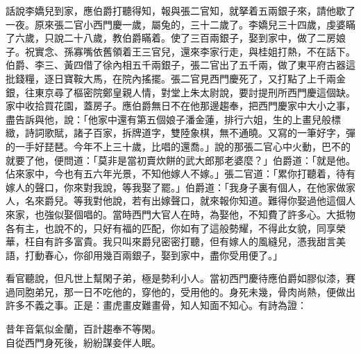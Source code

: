 話說李嬌兒到家，應伯爵打聽得知，報與張二官知，就拏着五兩銀子來，請他歇了一夜。原來張二官小西門慶一歲，屬兔的，三十二歲了。李嬌兒三十四歲，虔婆瞞了六歲，只說二十八歲，教伯爵瞞着。使了三百兩銀子，娶到家中，做了二房娘子。祝實念、孫寡嘴依舊領着王三官兒，還來李家行走，與桂姐打熱，不在話下。{}伯爵、李三、黃四借了徐內相五千兩銀子，張二官出了五千兩，做了東平府古器這批錢糧，逐日寶鞍大馬，在院內搖擺。張二官見西門慶死了，又打點了上千兩金銀，往東京尋了樞密院鄭皇親人情，對堂上朱太尉說，要討提刑所西門慶這個缺。家中收拾買花園，蓋房子。應伯爵無日不在他那邊趨奉，把西門慶家中大小之事，盡告訴與他，{}說：「他家中還有第五個娘子潘金蓮，排行六姐，生的上畫兒般標緻，詩詞歌賦，諸子百家，拆牌道字，雙陸象棋，無不通曉。又寫的一筆好字，彈的一手好琵琶。今年不上三十歲，比唱的還喬。」說的那張二官心中火動，巴不的就要了他，便問道：「莫非是當初賣炊餅的武大郎那老婆麼？」伯爵道：「就是他。佔來家中，今也有五六年光景，不知他嫁人不嫁。」張二官道：「累你打聽着，待有嫁人的聲口，你來對我說，等我娶了罷。」伯爵道：「我身子裏有個人，在他家做家人，名來爵兒。等我對他說，若有出嫁聲口，就來報你知道。難得你娶過他這個人來家，也強似娶個唱的。當時西門大官人在時，為娶他，不知費了許多心。大抵物各有主，也說不的，只好有福的匹配，你如有了這般勢耀，不得此女貌，同享榮華，枉自有許多富貴。我只叫來爵兒密密打聽，但有嫁人的風縫兒，憑我甜言美語，打動春心，你卻用幾百兩銀子，娶到家中，盡你受用便了。」

看官聽說，但凡世上幫閑子弟，極是勢利小人。當初西門慶待應伯爵如膠似漆，賽過同胞弟兄，那一日不吃他的，穿他的，受用他的。身死未幾，骨肉尚熱，便做出許多不義之事。{}正是：畫虎畫皮難畫骨，知人知面不知心。有詩為證：

\begin{myquote}
昔年音氣似金蘭，百計趨奉不等閑。\\自從西門身死後，紛紛謀妾伴人眠。
\end{myquote}

